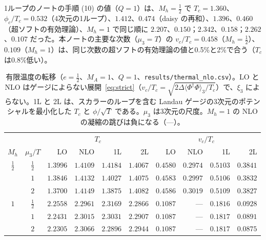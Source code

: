 \documentclass[a4paper,10pt]{ltjsarticle}
\begin{document}
1ループのノートの手順 (10) の値（$Q=1$）は、$M_h=\frac12$ で $T_c=1.360$、$\phi_c/T_c=0.532$（4次元の1ループ）、$1.412$、$0.474$（daisy の再和）、$1.396$、$0.460$（超ソフトの有効理論）、$M_h=1$ で同じ順に $2.207$、$0.150$；$2.342$、$0.158$；$2.262$、$0.107$ だった。本ノートの主要な次数（$\mu_3=T$）の $v_c/T_c=0.458$（$M_h=\frac12$）、$0.109$（$M_h=1$）は、同じ次数の超ソフトの有効理論の値と0.5\%と2\%で合う（$T_c$ は0.8\%低い）。

\begin{table}[tbp]
\centering\footnotesize
\caption{有限温度の転移（$e=\frac12$、$M_A=1$、$Q=1$、\texttt{results/thermal\_nlo.csv}）。LO と NLO はゲージによらない展開~\eqref{eq:strict}（$v_c/T_c=\sqrt{2\Delta\langle\Phi^\dagger\Phi\rangle_3/T_c}$）で、$\xi_3$ によらない。1L と 2L は、スカラーのループを含む Landau ゲージの3次元のポテンシャルを最小化した $T_c$ と $\phi/\sqrt T$ である。$\mu_3$ は3次元の尺度。$M_h=1$ の NLO の凝縮の跳びは負になる（—）。}
\label{tab:thnlo}
\begin{tabular}{ccrrrrrrrr}
\toprule
&& \multicolumn{4}{c}{$T_c$} & \multicolumn{4}{c}{$v_c/T_c$} \\
\cmidrule(lr){3-6}\cmidrule(lr){7-10}
$M_h$ & $\mu_3/T$ & LO & NLO & 1L & 2L & LO & NLO & 1L & 2L \\
\midrule
$\frac12$ & $\frac12$ & $1.3996$ & $1.4109$ & $1.4184$ & $1.4067$ & $0.4580$ & $0.2974$ & $0.5103$ & $0.3841$ \\
 & $1$ & $1.3846$ & $1.4132$ & $1.4027$ & $1.4075$ & $0.4583$ & $0.2997$ & $0.5106$ & $0.3832$ \\
 & $2$ & $1.3700$ & $1.4149$ & $1.3875$ & $1.4082$ & $0.4586$ & $0.3019$ & $0.5109$ & $0.3827$ \\
\midrule
$1$ & $\frac12$ & $2.2558$ & $2.2961$ & $2.3169$ & $2.2866$ & $0.1087$ & — & $0.1816$ & $0.0928$ \\
 & $1$ & $2.2431$ & $2.3015$ & $2.3031$ & $2.2907$ & $0.1087$ & — & $0.1817$ & $0.0891$ \\
 & $2$ & $2.2305$ & $2.3066$ & $2.2896$ & $2.2944$ & $0.1087$ & — & $0.1817$ & $0.0875$ \\
\bottomrule
\end{tabular}
\end{table}
\end{document}
